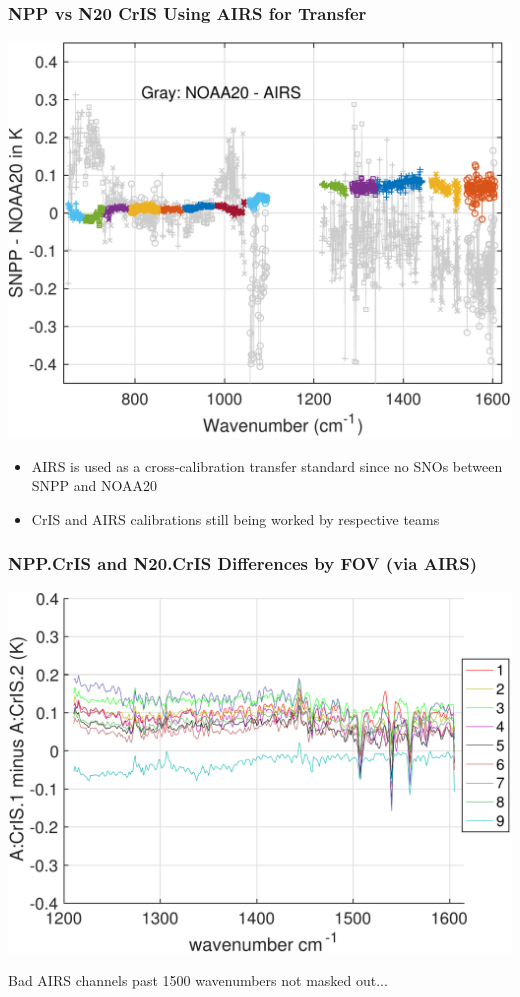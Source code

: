 \documentclass[10pt,t]{beamer}
\begin{document}
\begin{frame}
  \frametitle{NPP vs N20 CrIS Using AIRS for Transfer}
  \begin{center}
    \includegraphics[width=0.7\linewidth]{./Figs/sno_march2018_snpp_minus_noaa20_with_c2_airs_ingrey.pdf}
  \end{center}
\begin{small}
  \begin{itemize}
  \item AIRS is used as a cross-calibration transfer standard since no SNOs between SNPP and NOAA20
  \item CrIS and AIRS calibrations still being worked by respective teams
  \end{itemize}
\end{small}  
\end{frame}
\begin{frame}
  \frametitle{NPP.CrIS and N20.CrIS Differences by FOV (via AIRS)}
  \begin{center}
\includegraphics[width=0.85\linewidth]{./Figs/sno_ac1_ac2_dble_diff_lr_mw_cfov_2018febjun.pdf}
  \end{center}
\small Bad AIRS channels past 1500 wavenumbers not masked out...  
\end{frame}
\end{document}
